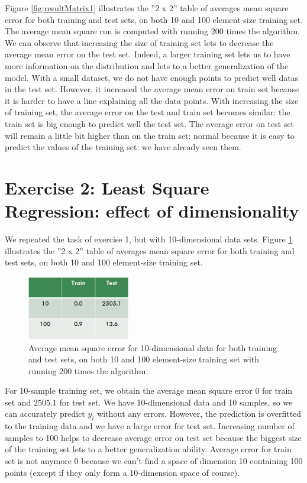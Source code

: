 \documentclass{article} %
\begin{document}
Figure \ref{fig:resultMatrix1} illustrates the ''2 x 2'' table of averages mean square error for both training and test sets, on both 10 and 100 element-size training set. The average mean square run is computed with running 200 times the algorithm. 
\\
We can observe that increasing the size of training set lets to decrease the average mean error on the test set. Indeed, a larger training set lets us to have more information on the distribution and lets to a better generalization of the model. With a small dataset, we do not have enough points to predict well datas in the test set.  
However, it increased the average mean error on train set because it is harder to have a line explaining all the data points.
With increasing the size of training set, the average error on the test and train set becomes similar: the train set is big enough to predict well the test set. The average error on test set will remain a little bit higher than on the train set: normal because it is easy to predict the values of the training set: we have already seen them.

\section{Exercise 2: Least Square Regression: effect of dimensionality}
We repeated the task of exercise 1, but with 10-dimensional data sets. Figure \ref{fig:resultMatrix2} illustrates the ''2 x 2'' table of averages mean square error for both training and test sets, on both 10 and 100 element-size training set.
\begin{figure}[h]
\begin{center}
\includegraphics[width=0.4\textwidth]{resultsMatrix2}
\end{center}
\caption{Average mean square error for 10-dimensional data for both training and test sets, on both 10 and 100 element-size training set with running 200 times the algorithm.}
\label{fig:resultMatrix2}
\end{figure}

For 10-sample training set, we obtain the average mean square error $0$ for train set and $2505.1$ for test set. We have 10-dimensional data and 10 samples, so we can accurately predict $y_i$ without any errors. However, the prediction is overfitted to the training data and we have a large error for test set. Increasing number of samples to 100 helps to decrease average error on test set because the biggest size of the training set lets to a better generalization ability. Average error for train set is not anymore 0 because we can't find a space of dimension 10 containing 100 points (except if they only form a 10-dimension space of course).
\end{document}
